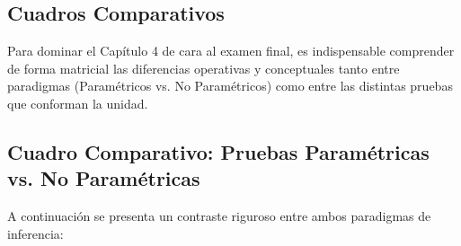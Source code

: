 \documentclass[11pt,a4paper]{article}
\begin{document}
\newpage
\begin{landscape}
\section{Cuadros Comparativos}

Para dominar el Capítulo 4 de cara al examen final, es indispensable comprender de forma matricial las diferencias operativas y conceptuales tanto entre paradigmas (Paramétricos vs. No Paramétricos) como entre las distintas pruebas que conforman la unidad.

\subsection{Cuadro Comparativo: Pruebas Paramétricas vs. No Paramétricas}
A continuación se presenta un contraste riguroso entre ambos paradigmas de inferencia:


\end{landscape}
\end{document}
